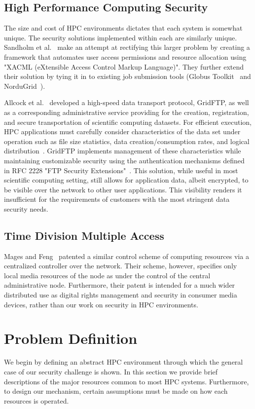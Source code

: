 \documentclass[oneside,12pt]{memoir}
\begin{document}
\section{High Performance Computing Security}
The size and cost of HPC environments dictates that each system is somewhat unique. The security solutions implemented within each are similarly unique. Sandholm et al.~\cite{sandholm2004ogsa} make an attempt at rectifying this larger problem by creating a framework that automates user access permissions and resource allocation using "XACML (eXtensible Access Control Markup Language)". They further extend their solution by tying it in to existing job submission tools (Globus Toolkit~\cite{globus_toolkit} and NorduGrid~\cite{nordugrid}). 

Allcock et al.~\cite{allcock2001secure} developed a high-speed data transport protocol, GridFTP, as well as a corresponding administrative service providing for the creation, registration, and secure transportation of scientific computing datasets. For efficient execution, HPC applications must carefully consider characteristics of the data set under operation such as file size statistics, data creation/consumption rates, and logical distribution~\cite{chervenak2000data}. GridFTP implements management of these characteristics while maintaining customizable security using the authentication mechanisms defined in RFC 2228 "FTP Security Extensions"~\cite{horowitz1997ftp}. This solution, while useful in most scientific computing setting, still allows for application data, albeit encrypted, to be visible over the network to other user applications. This visibility renders it insufficient for the requirements of customers with the most stringent data security needs.
\section{Time Division Multiple Access}
Mages and Feng~\cite{mages1999method} patented a similar control scheme of computing resources via a centralized controller over the network. Their scheme, however, specifies only local media resources of the node as under the control of the central administrative node. Furthermore, their patent is intended for a much wider distributed use as digital rights management and security in consumer media devices, rather than our work on security in HPC environments.

\chapter{Problem Definition}
\label{chap:problem_definition}
We begin by defining an abstract HPC environment through which the general case of our security challenge is shown. In this section we provide brief descriptions of the major resources common to most HPC systems. Furthermore, to design our mechanism, certain assumptions must be made on how each resources is operated. 
\end{document}

